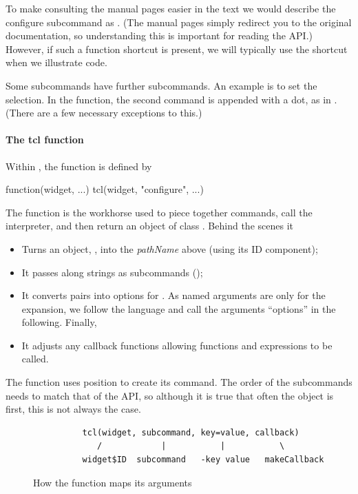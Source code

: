 To make consulting the \TK\/ manual pages easier in the text we would
describe the configure subcommand as
. (The \R\/ manual pages
simply redirect you to the original \TK\/ documentation, so
understanding this is important for reading the API.) However, if such
a function shortcut is present, we will typically use the shortcut when we
illustrate code. 

Some subcommands have further subcommands. An example
is to set the selection. In the \R\/ function, the second command is
appended with a dot, as in . (There are a few
necessary exceptions to this.)

\paragraph{The tcl function} 
Within , the  function is defined by

\begin{Sinput}
function(widget, ...) tcl(widget, "configure", ...)
\end{Sinput}

The  function is the workhorse used to piece
together \TCL\/ commands, call the interpreter, and then return an
object of class .  Behind the scenes it
\begin{itemize}
\item Turns an \R\/
object, , into the \textit{pathName} above (using its ID
component);
\item It passes along strings as subcommands ();
\item It converts \R\/  pairs into 
  options for \TCL. As named arguments are only for the  expansion, we follow the \TCL\/ language and call the
  arguments ``options'' in the following. Finally,
\item It adjusts any callback functions allowing \R{} functions and
  expressions to be called.
\end{itemize}
The  function uses position to create its command. The
order of the subcommands needs to match that of the \TK\/ API, so
although it is true that often the \R\/ object is first, this is not
always the case.

\begin{figure}
  \centering
\begin{verbatim}
          tcl(widget, subcommand, key=value, callback)
             /            |           |           \
          widget$ID  subcommand   -key value   makeCallback
\end{verbatim}
  \caption{How the  function maps its arguments}
  \label{fig:tcl-function-map}
\end{figure}







